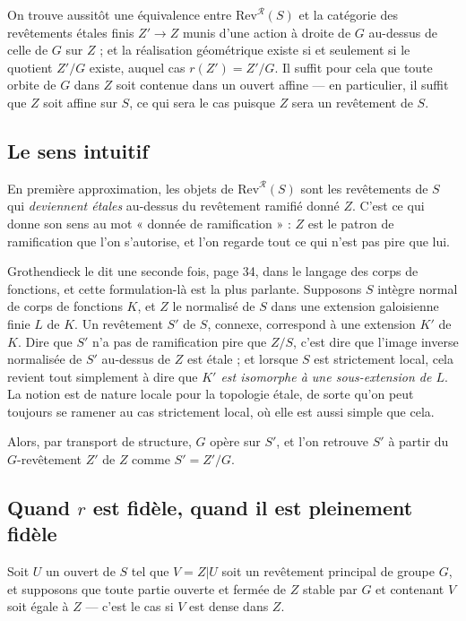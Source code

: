 \documentclass[11pt,a4paper]{article}
\begin{document}
On trouve aussitôt une équivalence entre $\mathrm{Rev}^{\mathcal{R}}(S)$ et la
catégorie des revêtements étales finis $Z' \to Z$ munis d'une action à droite
de $G$ au-dessus de celle de $G$ sur $Z$ ; et la réalisation géométrique
existe si et seulement si le quotient $Z'/G$
existe, auquel cas $r(Z') = Z'/G$. Il suffit pour cela que toute orbite de $G$
dans $Z$ soit contenue dans un ouvert affine --- en particulier, il suffit que
$Z$ soit affine sur $S$, ce qui sera le cas puisque $Z$ sera un revêtement de
$S$.

\subsection*{Le sens intuitif}

En première approximation, les objets de $\mathrm{Rev}^{\mathcal{R}}(S)$ sont
les revêtements de $S$ qui \emph{deviennent étales} au-dessus du revêtement
ramifié donné $Z$. C'est ce qui donne son sens au mot « donnée de
ramification » : $Z$ est le patron de ramification que l'on s'autorise, et l'on
regarde tout ce qui n'est pas pire que lui.

Grothendieck le dit une seconde fois, page 34, dans le langage des corps de
fonctions, et cette formulation-là est la plus parlante. Supposons $S$ intègre
normal de corps de fonctions $K$, et $Z$ le normalisé de $S$ dans une extension
galoisienne finie $L$ de $K$. Un revêtement $S'$ de $S$, connexe, correspond à
une extension $K'$ de $K$. Dire que $S'$ n'a pas de ramification pire que
$Z/S$, c'est dire que l'image inverse normalisée de $S'$ au-dessus de $Z$ est
étale ; et lorsque $S$ est strictement local, cela revient tout simplement à
dire que \emph{$K'$ est isomorphe à une sous-extension de $L$}. La notion est
de nature locale pour la topologie étale, de sorte qu'on peut toujours se
ramener au cas strictement local, où elle est aussi simple que cela.

Alors, par transport de structure, $G$ opère sur $S'$, et l'on retrouve $S'$ à
partir du $G$-revêtement $Z'$ de $Z$ comme $S' = Z'/G$.

\subsection*{Quand $r$ est fidèle, quand il est pleinement fidèle}

Soit $U$ un ouvert de $S$ tel que $V = Z|U$ soit un revêtement principal de
groupe $G$, et supposons que toute partie ouverte et fermée de $Z$ stable par
$G$ et contenant $V$ soit égale à $Z$ --- c'est le cas si $V$ est dense dans
$Z$.
\end{document}
